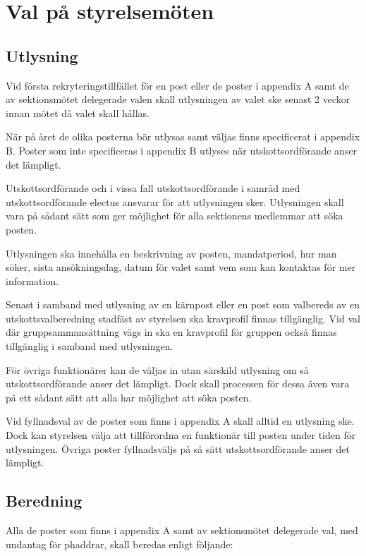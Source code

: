 \documentclass{dsekprotokoll}
\begin{document}
\section{Val på styrelsemöten}

\subsection{Utlysning}
Vid första rekryteringstillfället för en post eller de poster i appendix A samt de av sektionsmötet delegerade valen skall utlysningen av valet ske senast 2 veckor innan mötet då valet skall hållas.

När på året de olika posterna bör utlysas samt väljas finns specificerat i appendix B. Poster som inte specificeras i appendix B utlyses när utskottsordförande anser det lämpligt.

Utskottsordförande och i vissa fall utskottsordförande i samråd med utskottsordförande electus ansvarar för att utlysningen sker. Utlysningen skall vara på sådant sätt som ger möjlighet för alla sektionens medlemmar att söka posten.

Utlysningen ska innehålla en beskrivning av posten, mandatperiod, hur man söker, sista ansökningsdag, datum för valet samt vem som kan kontaktas för mer information.

Senast i samband med utlysning av en kärnpost eller en post som valbereds av en
utskottsvalberedning stadfäst av styrelsen ska kravprofil finnas tillgänglig. Vid val där gruppsammansättning vägs in ska en kravprofil för gruppen också finnas
tillgänglig i samband med utlysningen.

För övriga funktionärer kan de väljas in utan särskild utlysning om så utskottsordförande anser det lämpligt. Dock skall processen för dessa även vara på ett sådant sätt att alla har möjlighet att söka posten.

Vid fyllnadsval av de poster som finns i appendix A skall alltid en utlysning ske. Dock kan styrelsen välja att tillförordna en funktionär till posten under tiden för utlysningen. Övriga poster fyllnadsväljs på så sätt utskottsordförande anser det lämpligt.

\subsection{Beredning}

Alla de poster som finns i appendix A samt av sektionsmötet delegerade val, med undantag för phaddrar, skall beredas enligt följande: 
\end{document}
